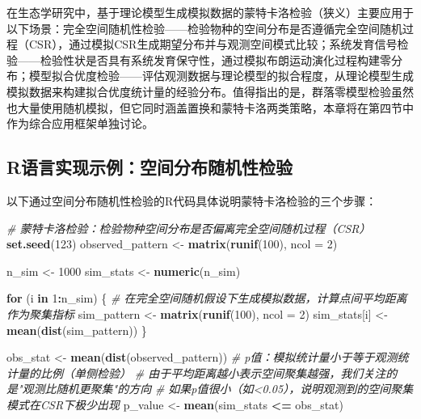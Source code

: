 \documentclass[
  twoside,12pt,fontset=none]{ctexbook}
\newenvironment{Shaded}{\begin{snugshade}}{\end{snugshade}}
\newcommand{\AttributeTok}[1]{\textcolor[rgb]{0.13,0.29,0.53}{#1}}
\newcommand{\CommentTok}[1]{\textcolor[rgb]{0.56,0.35,0.01}{\textit{#1}}}
\newcommand{\ControlFlowTok}[1]{\textcolor[rgb]{0.13,0.29,0.53}{\textbf{#1}}}
\newcommand{\DecValTok}[1]{\textcolor[rgb]{0.00,0.00,0.81}{#1}}
\newcommand{\FunctionTok}[1]{\textcolor[rgb]{0.13,0.29,0.53}{\textbf{#1}}}
\newcommand{\NormalTok}[1]{#1}
\newcommand{\OtherTok}[1]{\textcolor[rgb]{0.56,0.35,0.01}{#1}}
\newcommand{\SpecialCharTok}[1]{\textcolor[rgb]{0.81,0.36,0.00}{\textbf{#1}}}
\begin{document}
在生态学研究中，基于理论模型生成模拟数据的蒙特卡洛检验（狭义）主要应用于以下场景：完全空间随机性检验------检验物种的空间分布是否遵循完全空间随机过程（CSR），通过模拟CSR生成期望分布并与观测空间模式比较；系统发育信号检验------检验性状是否具有系统发育保守性，通过模拟布朗运动演化过程构建零分布；模型拟合优度检验------评估观测数据与理论模型的拟合程度，从理论模型生成模拟数据来构建拟合优度统计量的经验分布。值得指出的是，群落零模型检验虽然也大量使用随机模拟，但它同时涵盖置换和蒙特卡洛两类策略，本章将在第四节中作为综合应用框架单独讨论。

\hypertarget{rux8bedux8a00ux5b9eux73b0ux793aux4f8bux7a7aux95f4ux5206ux5e03ux968fux673aux6027ux68c0ux9a8c}{%
\subsection{R语言实现示例：空间分布随机性检验}\label{rux8bedux8a00ux5b9eux73b0ux793aux4f8bux7a7aux95f4ux5206ux5e03ux968fux673aux6027ux68c0ux9a8c}}

以下通过空间分布随机性检验的R代码具体说明蒙特卡洛检验的三个步骤：

\begin{Shaded}
\begin{Highlighting}[]
\CommentTok{\# 蒙特卡洛检验：检验物种空间分布是否偏离完全空间随机过程（CSR）}
\FunctionTok{set.seed}\NormalTok{(}\DecValTok{123}\NormalTok{)}
\NormalTok{observed\_pattern }\OtherTok{\textless{}{-}} \FunctionTok{matrix}\NormalTok{(}\FunctionTok{runif}\NormalTok{(}\DecValTok{100}\NormalTok{), }\AttributeTok{ncol =} \DecValTok{2}\NormalTok{)}

\NormalTok{n\_sim }\OtherTok{\textless{}{-}} \DecValTok{1000}
\NormalTok{sim\_stats }\OtherTok{\textless{}{-}} \FunctionTok{numeric}\NormalTok{(n\_sim)}

\ControlFlowTok{for}\NormalTok{ (i }\ControlFlowTok{in} \DecValTok{1}\SpecialCharTok{:}\NormalTok{n\_sim) \{}
  \CommentTok{\# 在完全空间随机假设下生成模拟数据，计算点间平均距离作为聚集指标}
\NormalTok{  sim\_pattern }\OtherTok{\textless{}{-}} \FunctionTok{matrix}\NormalTok{(}\FunctionTok{runif}\NormalTok{(}\DecValTok{100}\NormalTok{), }\AttributeTok{ncol =} \DecValTok{2}\NormalTok{)}
\NormalTok{  sim\_stats[i] }\OtherTok{\textless{}{-}} \FunctionTok{mean}\NormalTok{(}\FunctionTok{dist}\NormalTok{(sim\_pattern))}
\NormalTok{\}}

\NormalTok{obs\_stat }\OtherTok{\textless{}{-}} \FunctionTok{mean}\NormalTok{(}\FunctionTok{dist}\NormalTok{(observed\_pattern))}
\CommentTok{\# p值：模拟统计量小于等于观测统计量的比例（单侧检验）}
\CommentTok{\# 由于平均距离越小表示空间聚集越强，我们关注的是"观测比随机更聚集"的方向}
\CommentTok{\# 如果p值很小（如\textless{}0.05），说明观测到的空间聚集模式在CSR下极少出现}
\NormalTok{p\_value }\OtherTok{\textless{}{-}} \FunctionTok{mean}\NormalTok{(sim\_stats }\SpecialCharTok{\textless{}=}\NormalTok{ obs\_stat)}
\end{Highlighting}
\end{Shaded}
\end{document}
